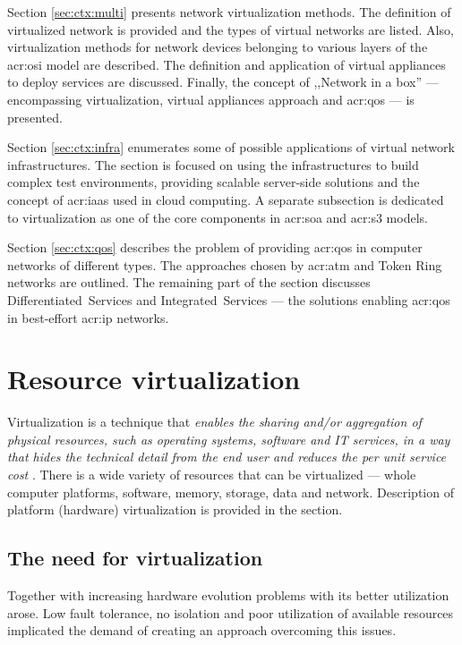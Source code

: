 \documentclass[11pt,openany]{book}
\begin{document}
    Section \ref{sec:ctx:multi} presents network virtualization methods. The definition of virtualized network is
    provided and the types of virtual networks are listed. Also, virtualization methods for network devices belonging to
    various layers of the \gls{acr:osi} model are described. The definition and application of virtual appliances to
    deploy services are discussed. Finally, the concept of ,,Network in a box'' --- encompassing virtualization, virtual
    appliances approach and \gls{acr:qos} --- is presented.

    Section \ref{sec:ctx:infra} enumerates some of possible applications of virtual network infrastructures. The section
    is focused on using the infrastructures to build complex test environments, providing scalable server-side solutions
    and the concept of \gls{acr:iaas} used in cloud computing. A separate subsection is dedicated to virtualization as
    one of the core components in \gls{acr:soa} and \gls{acr:s3} models.

    Section \ref{sec:ctx:qos} describes the problem of providing \gls{acr:qos} in computer networks of different types.
    The approaches chosen by \gls{acr:atm} and Token Ring networks are outlined. The remaining part of the section
    discusses Differentiated~Services and Integrated~Services --- the solutions enabling \gls{acr:qos} in best-effort
    \gls{acr:ip} networks.


    \section{Resource virtualization}
    \label{sec:ctx:virt}

      Virtualization is a technique that \textit{enables the sharing and/or aggregation of physical resources, such as
      operating systems, software and IT services, in a way that hides the technical detail from the end user and
      reduces the per unit service cost} \cite{turban}. There is a wide variety of resources that can be virtualized ---
      whole computer platforms, software, memory, storage, data and network. Description of platform (hardware)
      virtualization is provided in the section.


      \subsection{The need for virtualization}

        Together with increasing hardware evolution problems with its better utilization arose. Low fault tolerance, no
        isolation and poor utilization of available resources implicated the demand of creating an approach overcoming
        this issues. 
\end{document}
